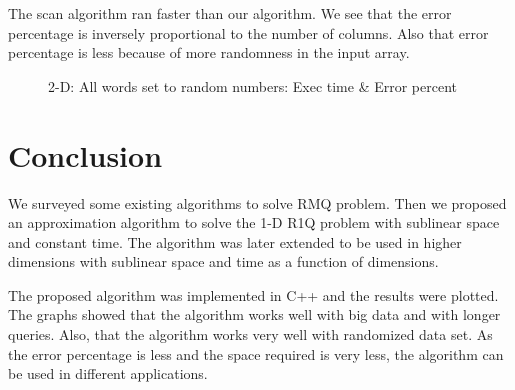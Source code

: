 \documentclass{article}
\begin{document}
The scan algorithm ran faster than our algorithm. We see that the error percentage is inversely proportional to the number of columns. Also that error percentage is less because of more randomness in the input array.
\begin{figure}
\mbox{}
\caption{2-D: All words set to random numbers: Exec time \& Error percent} \label{2drandom}
\end{figure}

\section{Conclusion}
We surveyed some existing algorithms to solve RMQ problem. Then we proposed an approximation algorithm to solve the 1-D R1Q problem with sublinear space and constant time. The algorithm was later extended to be used in higher dimensions with sublinear space and time as a function of dimensions.

The proposed algorithm was implemented in C++ and the results were plotted. The graphs showed that the algorithm works well with big data and with longer queries. Also, that the algorithm works very well with randomized data set. As the error percentage is less and the space required is very less, the algorithm can be used in different applications.



\end{document}
